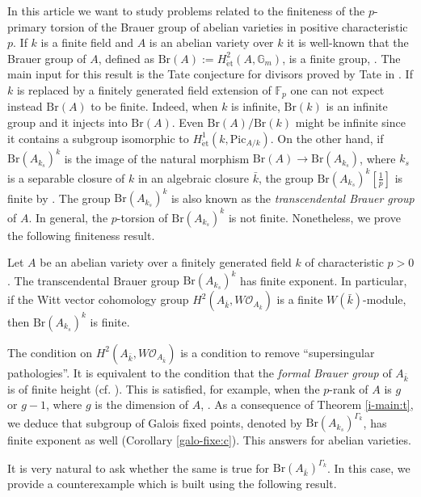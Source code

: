 \documentclass[11pt]{amsart}
\newcommand{\spa}{\medskip}
\newcommand{\Fp}{\mathbb{F}_p}
\newcommand{\kbar}{{\bar{k}}}
\newcommand{\Gm}{\mathbb{G}_m}
\newcommand{\calO}{\mathcal{O}}
\newcommand{\et}{\mathrm{\acute{e}t}}
\newcommand{\Pic}{\mathrm{Pic}}
\newcommand{\Br}{\mathrm{Br}}
\newcommand{\ks}{{k_s}}
\begin{document}
In this article we want to study problems related to the finiteness of the $p$-primary torsion of the Brauer group of abelian varieties in positive characteristic $p$. If $k$ is a finite field and $A$ is an abelian variety over $k$ it is well-known that the Brauer group of $A$, defined as $\Br(A):=H^2_\et(A,\Gm)$, is a finite group, \cite[Prop. 4.3]{Tat94}. The main input for this result is the Tate conjecture for divisors proved by Tate in \cite{Tat66}. If $k$ is replaced by a finitely generated field extension of $\Fp$ one can not expect instead $\Br(A)$ to be finite. Indeed, when $k$ is infinite, $\Br(k)$ is an infinite group and it injects into $\Br(A)$. Even $\Br(A)/\Br(k)$ might be infinite since it contains a subgroup isomorphic to $H^1_\et(k,\Pic_{A/k})$. On the other hand, if $\Br(A_{\ks})^{k}$ is the image of the natural morphism $\Br(A)\to \Br(A_{\ks})$, where $\ks$ is a separable closure of $k$ in an algebraic closure $\kbar$, the group $\Br(A_{\ks})^{k}[\tfrac{1}{p}]$ is finite by \cite[Thm. 16.2.3]{CS21}. The group $\Br(A_{\ks})^{k}$ is also known as the \textit{transcendental Brauer group} of $A$. In general, the $p$-torsion of $\Br(A_{\ks})^{k}$ is not finite. Nonetheless, we prove the following finiteness result.

\begin{theo}\label{i-main:t}
Let $A$ be an abelian variety over a finitely generated field $k$ of characteristic $p>0$. The transcendental Brauer group $\Br(A_{\ks})^{k}$ has finite exponent. In particular, if the Witt vector cohomology group $H^2(A_{\kbar},W\calO_{A_\kbar})$ is a finite $W(\kbar)$-module, then $\Br(A_{\ks})^{k}$ is finite.
\end{theo}

The condition on $H^2(A_{\kbar},W\calO_{A_\kbar})$ is a condition to remove “supersingular pathologies”. It is equivalent to the condition that the \textit{formal Brauer group} of $A_\kbar$ is of finite height (cf. \cite{AM77}). This is satisfied, for example, when the $p$-rank of $A$ is $g$ or $g-1$, where $g$ is the dimension of $A$, \cite[Cor. 6.3.16]{Ill83}. As a consequence of Theorem \ref{i-main:t}, we deduce that subgroup of Galois fixed points, denoted by $\Br(A_{\ks})^{\Gamma_k}$, has finite exponent as well (Corollary \ref{galo-fixe:c}). This answers \cite[Ques. 1 and Ques. 2]{SZ08} for abelian varieties. 

\spa

It is very natural to ask whether the same is true for $\Br(A_{\kbar})^{\Gamma_k}$. In this case, we provide a counterexample which is built using the following result.
\end{document}
